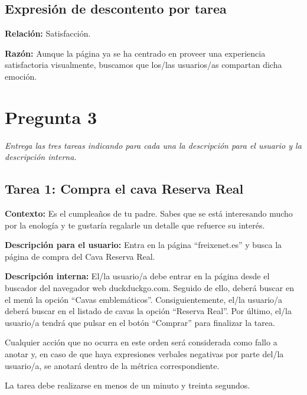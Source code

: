 \documentclass[spanish]{article}
\begin{document}
\subsection{Expresión de descontento por tarea}

\textbf{Relación:} Satisfacción.\newline

\textbf{Razón:} Aunque la página ya se ha centrado en
proveer una experiencia satisfactoria visualmente, buscamos
que los/las usuarios/as compartan dicha emoción.

\newpage

\section{Pregunta 3}

\textit{Entrega las tres tareas indicando para cada una la
descripción para el usuario y la descripción interna.}

\subsection{Tarea 1: Compra el cava Reserva Real}

\textbf{Contexto:} Es el cumpleaños de tu padre. Sabes que
se está interesando mucho por la enología y te gustaría
regalarle un detalle que refuerce su interés.\newline

\textbf{Descripción para el usuario:} Entra en la página
``freixenet.es'' y busca la página de compra del Cava
Reserva Real.\newline

\textbf{Descripción interna:} El/la usuario/a debe entrar en
la página desde el buscador del navegador web
duckduckgo.com. Seguido de ello, deberá buscar en el menú la
opción ``Cavas emblemáticos''. Consiguientemente, el/la
usuario/a deberá buscar en el listado de cavas la opción
``Reserva Real''. Por último, el/la usuario/a tendrá que
pulsar en el botón ``Comprar'' para finalizar la
tarea.\newline

Cualquier acción que no ocurra en este orden será
considerada como fallo a anotar y, en caso de que haya
expresiones verbales negativas por parte del/la usuario/a,
se anotará dentro de la métrica correspondiente.\newline

La tarea debe realizarse en menos de un minuto y treinta
segundos.
\end{document}
